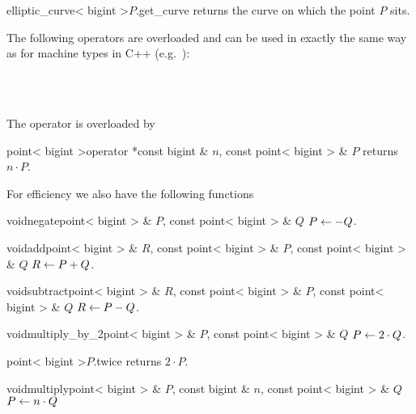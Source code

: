 \begin{cfcode}{elliptic_curve< bigint >}{$P$.get_curve}{}
  returns the curve on which the point $P$ sits.
\end{cfcode}



\ARTH

The following operators are overloaded and can be used in exactly the same way as for machine
types in C++ (e.g.~):
\begin{center}
   \\
   \\
\end {center}
The \code{*} operator is overloaded by

\begin{fcode}{point< bigint >}{operator *}{const bigint & $n$, const point< bigint > & $P$}
  returns $n \cdot P$.
\end{fcode}

For efficiency we also have the following functions

\begin{fcode}{void}{negate}{point< bigint > & $P$, const point< bigint > & $Q$}
  $P \leftarrow -Q$.
\end{fcode}

\begin{fcode}{void}{add}{point< bigint > & $R$, const point< bigint > & $P$,
    const point< bigint > & $Q$}%
  $R \leftarrow P + Q$.
\end{fcode}

\begin{fcode}{void}{subtract}{point< bigint > & $R$,
    const point< bigint > & $P$, const point< bigint > & $Q$}%
  $R \leftarrow P - Q$.
\end{fcode}

\begin{fcode}{void}{multiply_by_2}{point< bigint > & $P$, const point< bigint > & $Q$}
  $P \leftarrow 2 \cdot Q$.
\end{fcode}

\begin{cfcode}{point< bigint >}{$P$.twice}{}
  returns $2 \cdot P$. 
\end{cfcode}

\begin{fcode}{void}{multiply}{point< bigint > & $P$, const bigint & $n$, const point< bigint > & $Q$}
  $P \leftarrow n \cdot Q$
\end{fcode}



